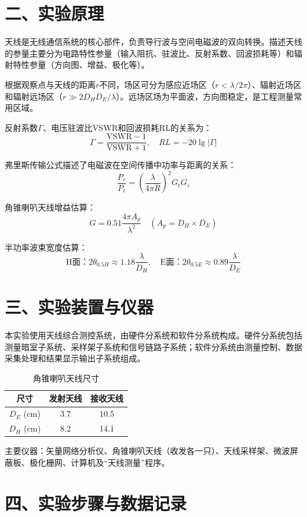 \documentclass[12pt,a4paper]{article}
\begin{document}
\section*{二、实验原理}
天线是无线通信系统的核心部件，负责导行波与空间电磁波的双向转换。描述天线的参量主要分为电路特性参量（输入阻抗、驻波比、反射系数、回波损耗等）和辐射特性参量（方向图、增益、极化等）。

根据观察点与天线的距离$r$不同，场区可分为感应近场区（$r < \lambda/2\pi$）、辐射近场区和辐射远场区（$r \gg 2D_HD_E/\lambda$）。远场区场为平面波，方向图稳定，是工程测量常用区域。

反射系数$\Gamma$、电压驻波比VSWR和回波损耗RL的关系为：
\[
\Gamma = \frac{\text{VSWR} - 1}{\text{VSWR} + 1}, \quad RL = -20\lg|\Gamma|
\]

弗里斯传输公式描述了电磁波在空间传播中功率与距离的关系：
\[
\frac{P_r}{P_t} = \left(\frac{\lambda}{4\pi R}\right)^2 G_t G_r
\]

角锥喇叭天线增益估算：
\[
G = 0.51\frac{4\pi A_p}{\lambda^2} \quad (A_p = D_H \times D_E)
\]

半功率波束宽度估算：
\[
\text{H面：}2\theta_{0.5H} \approx 1.18\frac{\lambda}{D_H}, \quad
\text{E面：}2\theta_{0.5E} \approx 0.89\frac{\lambda}{D_E}
\]

\section*{三、实验装置与仪器}
本实验使用天线综合测控系统，由硬件分系统和软件分系统构成。硬件分系统包括测量暗室子系统、采样架子系统和信号链路子系统；软件分系统由测量控制、数据采集处理和结果显示输出子系统组成。

\begin{table}[H]
\centering
\caption{角锥喇叭天线尺寸}
\begin{tabular}{c|c|c}
\hline
\textbf{尺寸} & \textbf{发射天线} & \textbf{接收天线} \\
\hline
$D_E$ (cm) & 3.7 & 10.5 \\
$D_H$ (cm) & 8.2 & 14.1 \\
\hline
\end{tabular}
\end{table}

主要仪器：矢量网络分析仪、角锥喇叭天线（收发各一只）、天线采样架、微波屏蔽板、极化栅网、计算机及“天线测量”程序。

\section*{四、实验步骤与数据记录}
\end{document}
